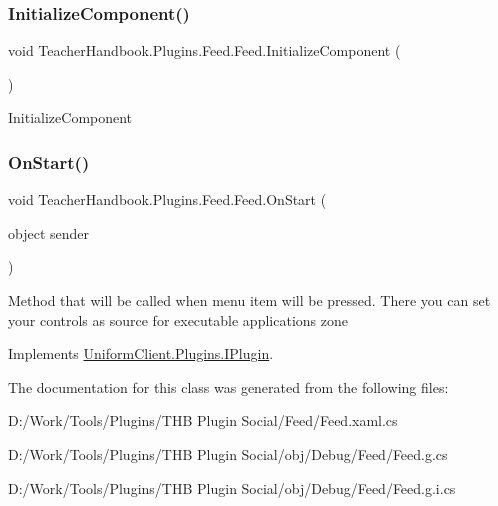 \subsubsection{\texorpdfstring{Initialize\+Component()}{InitializeComponent()}\hspace{0.1cm}{\footnotesize\ttfamily [7/7]}}
{\footnotesize\ttfamily void Teacher\+Handbook.\+Plugins.\+Feed.\+Feed.\+Initialize\+Component (\begin{DoxyParamCaption}{ }\end{DoxyParamCaption})}



Initialize\+Component 

\mbox{\label{class_teacher_handbook_1_1_plugins_1_1_feed_1_1_feed_a70afd18136a6dc16b5edec667a02e6c6}} 
\subsubsection{\texorpdfstring{On\+Start()}{OnStart()}}
{\footnotesize\ttfamily void Teacher\+Handbook.\+Plugins.\+Feed.\+Feed.\+On\+Start (\begin{DoxyParamCaption}\item[{object}]{sender }\end{DoxyParamCaption})}



Method that will be called when menu item will be pressed. There you can set your controls as source for executable application\textquotesingle{}s zone 



Implements \mbox{\hyperlink{interface_uniform_client_1_1_plugins_1_1_i_plugin_a1ca2220c7ce4a23f8f41af10efccf328}{Uniform\+Client.\+Plugins.\+I\+Plugin}}.



The documentation for this class was generated from the following files\+:\begin{DoxyCompactItemize}
\item 
D\+:/\+Work/\+Tools/\+Plugins/\+T\+H\+B Plugin Social/\+Feed/Feed.\+xaml.\+cs\item 
D\+:/\+Work/\+Tools/\+Plugins/\+T\+H\+B Plugin Social/obj/\+Debug/\+Feed/Feed.\+g.\+cs\item 
D\+:/\+Work/\+Tools/\+Plugins/\+T\+H\+B Plugin Social/obj/\+Debug/\+Feed/Feed.\+g.\+i.\+cs\end{DoxyCompactItemize}
